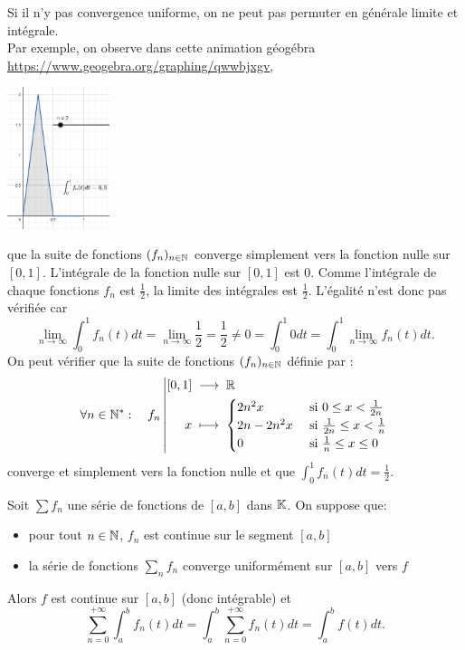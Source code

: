 \documentclass{book}
\newcommand{\fn}{(f_n)_{n\in \N   }}
\newcommand{\Sfn}{\sum f_n}
\begin{document}
\begin{Remarque}
Si il n'y pas convergence uniforme, on ne peut pas permuter en générale limite et intégrale. \\
Par exemple, on observe dans cette animation géogébra \url{https://www.geogebra.org/graphing/qwwbjxgv},
 \begin{center}\includegraphics[width=3cm]{contre_exemple_limite_integrale.png}\end{center} que la suite de fonctions $\fn$ converge simplement vers la fonction nulle sur $[0,1]$. L'intégrale de la fonction nulle sur $[0,1]$ est $0$. Comme l'intégrale de chaque fonctions $f_n$ est $\frac 1 2$, la limite des intégrales est $\frac 1 2$. L'égalité n'est donc pas vérifiée car $$ \lim\limits_{n \to \infty} \int_0^1 f_n(t)dt =  \lim\limits_{n \to \infty} \frac 1 2 = \frac 1 2 \neq 0  = \int_0^1 0dt= \int_0^1 \lim\limits_{n \to \infty} f_n(t)dt.$$
On peut vérifier que la suite de fonctions $\fn$ définie par :
$$\forall n \in \mathbb{N}^* :\quad  {f_n}\left|\begin{aligned}{[0,1]}&\;\longrightarrow\;{\mathbb{R}}\\{x}&\;\longmapsto\;{\begin{cases}2n^2x&\text{ si } 0\leq x < \frac{1}{2n}\\2n-2n^2x&\text{ si } \frac{1}{2n}\leq x < \frac{1}{n}  \\0&\text{ si } \frac{1}{n}\leq x \leq 0 \end{cases}}\end{aligned}\right.$$ converge et simplement vers la fonction nulle et que  $\int_0^1 f_n(t)dt = \frac 1 2$. 
\end{Remarque}
\begin{Theoreme}
Soit $\Sfn$ une série de fonctions de $[a,b]$ dans $\mathbb{K}  $.
On suppose que:
\begin{itemize}
\item
  pour tout $n\in \mathbb{N}   $, $f_n$ est continue sur le segment $[a,b]$
\item
  la série de fonctions $\sum _n f_n$ converge uniformément sur $[a,b]$ vers $f$
\end{itemize}
Alors $f$ est continue sur $[a,b]$ (donc intégrable) et
\[  \sum _{n=0}^{+\infty } \int_a^b f_n(t)dt = \int_a^b \sum _{n=0}^{+\infty } f_n(t)dt= \int_a^b f(t)dt.   \]
\end{Theoreme}
\end{document}
